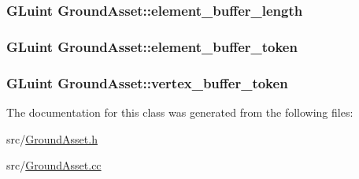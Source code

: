\subsubsection[{element\+\_\+buffer\+\_\+length}]{\setlength{\rightskip}{0pt plus 5cm}G\+Luint Ground\+Asset\+::element\+\_\+buffer\+\_\+length\hspace{0.3cm}{\ttfamily [private]}}\label{classGroundAsset_a68cd956ec94f65cd5def56e3e442cd55}
\hypertarget{classGroundAsset_af9612e4d7ba49cbacc2ee93266c2b89e}{}
\subsubsection[{element\+\_\+buffer\+\_\+token}]{\setlength{\rightskip}{0pt plus 5cm}G\+Luint Ground\+Asset\+::element\+\_\+buffer\+\_\+token\hspace{0.3cm}{\ttfamily [private]}}\label{classGroundAsset_af9612e4d7ba49cbacc2ee93266c2b89e}
\hypertarget{classGroundAsset_a32dbd8507aff2931228318f84160e493}{}
\subsubsection[{vertex\+\_\+buffer\+\_\+token}]{\setlength{\rightskip}{0pt plus 5cm}G\+Luint Ground\+Asset\+::vertex\+\_\+buffer\+\_\+token\hspace{0.3cm}{\ttfamily [private]}}\label{classGroundAsset_a32dbd8507aff2931228318f84160e493}


The documentation for this class was generated from the following files\+:\begin{DoxyCompactItemize}
\item 
src/\hyperlink{GroundAsset_8h}{Ground\+Asset.\+h}\item 
src/\hyperlink{GroundAsset_8cc}{Ground\+Asset.\+cc}\end{DoxyCompactItemize}
